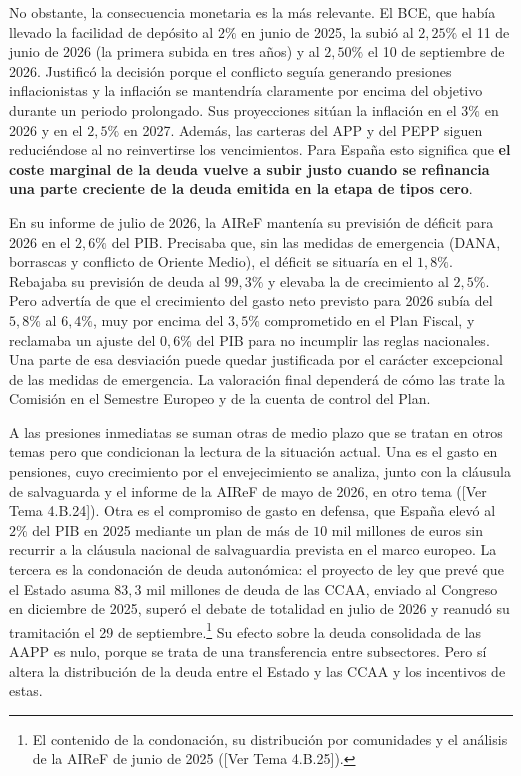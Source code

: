 \documentclass[10pt,a4paper]{article}
\newcommand{\authorfont}[1]{{\fontfamily{EBGaramond-TLF}\selectfont #1}}
\begin{document}
No obstante, la consecuencia monetaria es la más relevante. El BCE, que había llevado la facilidad de depósito al $2\%$ en junio de 2025, la subió al $2,25\%$ el 11 de junio de 2026 (la primera subida en tres años) y al $2,50\%$ el 10 de septiembre de 2026. Justificó la decisión porque el conflicto seguía generando presiones inflacionistas y la inflación se mantendría claramente por encima del objetivo durante un periodo prolongado. Sus proyecciones sitúan la inflación en el $3\%$ en 2026 y en el $2,5\%$ en 2027. Además, las carteras del APP y del PEPP siguen reduciéndose al no reinvertirse los vencimientos. Para España esto significa que \textbf{el coste marginal de la deuda vuelve a subir justo cuando se refinancia una parte creciente de la deuda emitida en la etapa de tipos cero}.

En su informe de julio de 2026, la AIReF mantenía su previsión de déficit para 2026 en el $2,6\%$ del PIB. Precisaba que, sin las medidas de emergencia (DANA, borrascas y conflicto de Oriente Medio), el déficit se situaría en el $1,8\%$. Rebajaba su previsión de deuda al $99,3\%$ y elevaba la de crecimiento al $2,5\%$. Pero advertía de que el crecimiento del gasto neto previsto para 2026 subía del $5,8\%$ al $6,4\%$, muy por encima del $3,5\%$ comprometido en el Plan Fiscal, y reclamaba un ajuste del $0,6\%$ del PIB para no incumplir las reglas nacionales. Una parte de esa desviación puede quedar justificada por el carácter excepcional de las medidas de emergencia. La valoración final dependerá de cómo las trate la Comisión en el Semestre Europeo y de la cuenta de control del Plan.

A las presiones inmediatas se suman otras de medio plazo que se tratan en otros temas pero que condicionan la lectura de la situación actual. Una es el gasto en pensiones, cuyo crecimiento por el envejecimiento se analiza, junto con la cláusula de salvaguarda y el informe de la AIReF de mayo de 2026, en otro tema ([\authorfont{Ver Tema 4.B.24}]). Otra es el compromiso de gasto en defensa, que España elevó al $2\%$ del PIB en 2025 mediante un plan de más de $10$ mil millones de euros sin recurrir a la cláusula nacional de salvaguardia prevista en el marco europeo. La tercera es la condonación de deuda autonómica: el proyecto de ley que prevé que el Estado asuma $83,3$ mil millones de deuda de las CCAA, enviado al Congreso en diciembre de 2025, superó el debate de totalidad en julio de 2026 y reanudó su tramitación el 29 de septiembre.\footnote{%
    El contenido de la condonación, su distribución por comunidades y el análisis de la AIReF de junio de 2025 ([\authorfont{Ver Tema 4.B.25}]).
} Su efecto sobre la deuda consolidada de las AAPP es nulo, porque se trata de una transferencia entre subsectores. Pero sí altera la distribución de la deuda entre el Estado y las CCAA y los incentivos de estas.
\end{document}
